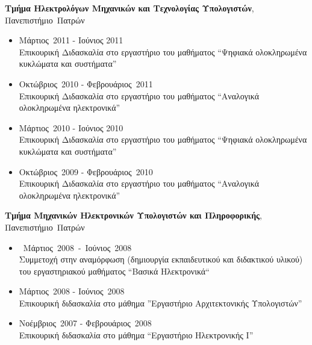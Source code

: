 \documentclass[11pt]{article}
\newenvironment{outerlist}[1][\enskip\textbullet]%
        {\begin{itemize}[#1]}{\end{itemize}%
         \vspace{-.6\baselineskip}}
\newcommand{\blankline}{\quad\pagebreak[2]}
\begin{document}
\blankline

\textbf{Τμήμα Ηλεκτρολόγων Μηχανικών και Τεχνολογίας Υπολογιστών},
\\Πανεπιστήμιο~Πατρών
\begin{outerlist}
\item[] \hfill Μάρτιος~2011 - Ιούνιος 2011 \\ Επικουρική Διδασκαλία στο
εργαστήριο του μαθήματος ``Ψηφιακά ολοκληρωμένα κυκλώματα και συστήματα''
\item[] \hfill Οκτώβριος~2010 - Φεβρουάριος~2011 \\ Επικουρική Διδασκαλία στο
εργαστήριο του μαθήματος ``Αναλογικά ολοκληρωμένα ηλεκτρονικά''
\item[] \hfill Μάρτιος~2010 - Ιούνιος 2010 \\ Επικουρική Διδασκαλία στο
εργαστήριο του μαθήματος ``Ψηφιακά ολοκληρωμένα κυκλώματα και συστήματα''
\item[] \hfill Οκτώβριος~2009 - Φεβρουάριος~2010 \\ Επικουρική Διδασκαλία στο
εργαστήριο του μαθήματος ``Αναλογικά ολοκληρωμένα ηλεκτρονικά''
\end{outerlist}

\blankline

\textbf{Τμήμα Μηχανικών Ηλεκτρονικών Υπολογιστών και Πληροφορικής}, \\Πανεπιστήμιο~Πατρών
\begin{outerlist}
\item[] \hfill~Μάρτιος~2008~-~Ιούνιος~2008\\ Συμμετοχή στην αναμόρφωση (δημιουργία εκπαιδευτικού και διδακτικού υλικού) του εργαστηριακού μαθήματος ``Βασικά Ηλεκτρονικά``
\item[] \hfill Μάρτιος~2008 - Ιούνιος~2008\\ Επικουρική διδασκαλία στο μάθημα ''Εργαστήριο Αρχιτεκτονικής Υπολογιστών''
\item[] \hfill Νοέμβριος~2007 - Φεβρουάριος~2008\\ Επικουρική διδασκαλία στο μάθημα ``Εργαστήριο Ηλεκτρονικής Ι''
\end{outerlist}

\blankline
\end{document}
